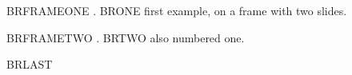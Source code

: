

\begin{frame}{BRFRAMEONE}
\ex. BRONE first example, on a frame with two slides.
\end{frame}

\setcounter{ExNo}{0}

\begin{frame}{BRFRAMETWO}
\ex. BRTWO also numbered one.

BRLAST \Last
\end{frame}

